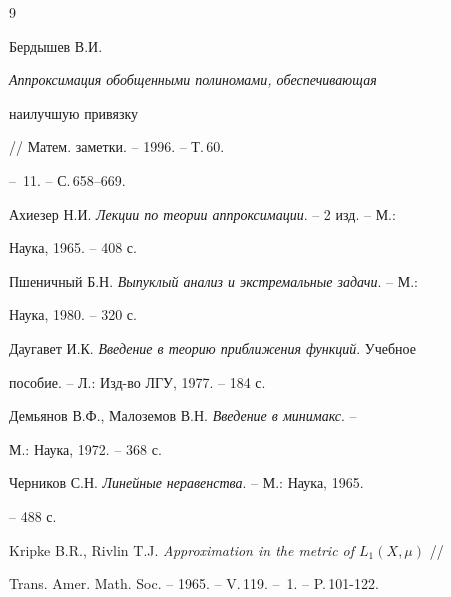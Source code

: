  


\begin{thebibliography}{9} 


 




Бердышев В.И. {\em Аппроксимация обобщенными полиномами, обеспечивающая 


наилучшую привязку} // Матем. заметки. -- 1996. -- Т.\,60.


-- \No\,11. -- С.\,658--669. 




Ахиезер Н.И. {\em Лекции по теории аппроксимации}. -- 2 изд. -- М.: 


Наука, 1965. -- 408 с. 




Пшеничный Б.Н. {\em Выпуклый анализ и экстремальные задачи}. -- М.: 


Наука, 1980. -- 320 с. 




Даугавет И.К. {\em Введение в теорию приближения функций}. Учебное 


пособие. -- Л.: Изд-во ЛГУ, 1977. -- 184 с. 




Демьянов В.Ф., Малоземов В.Н. {\em Введение в минимакс}. --


М.: Наука, 1972. -- 368 с. 




Черников С.Н. {\em Линейные неравенства}. -- М.: Наука, 1965. 


-- 488 с. 




Kripke B.R., Rivlin T.J. {\em Approximation in the metric of $L_1(X,\mu)$} // 


Trans. Amer. Math. Soc. -- 1965. -- V.\,119. -- \No\,1. -- P.\,101-122. 


 


 


\end{thebibliography} 


 


\vskip 2cm 


 






 


\label{end} 


 


